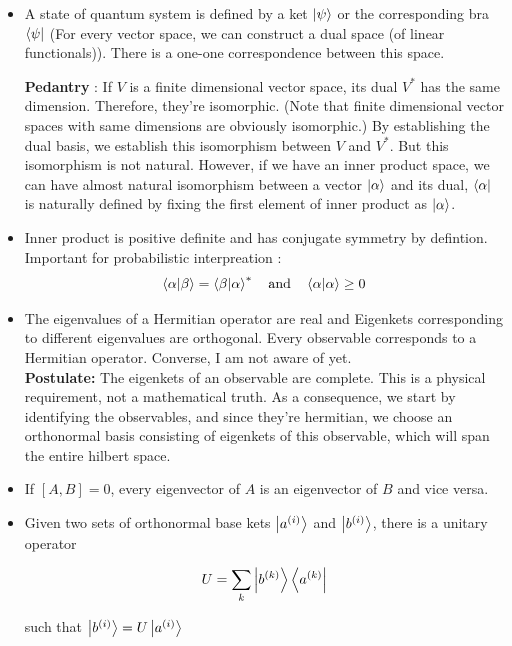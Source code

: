 \documentclass{report}
\begin{document}
\begin{itemize}

  \item A state of quantum system is defined by a ket $\ket{\psi}$ or the corresponding bra $\bra{\psi}$ (For every vector space, we can construct a dual space (of linear functionals)). There is a one-one correspondence between this space.

  \noindent \textbf {Pedantry} : If $V$ is a finite dimensional vector space, its dual $V^*$ has the same dimension. Therefore, they're isomorphic. (Note that finite dimensional vector spaces with same dimensions are obviously isomorphic.) By establishing the dual basis, we establish this isomorphism between $V$ and $V^*$. But this isomorphism is not natural. However, if we have an inner product space, we can have almost natural isomorphism between a vector $\ket{\alpha}$ and its dual, $\bra{\alpha}$ is naturally defined by fixing the first element of inner product as $\ket{\alpha}$.

  \item Inner product is positive definite and has conjugate symmetry by defintion. Important for probabilistic interpreation :
    $$\bra{\alpha}\ket{\beta} = \bra{\beta}\ket{\alpha}^* \quad \textrm{and} \quad \bra{\alpha}\ket{\alpha} \ge 0$$ 

  \item The eigenvalues of a Hermitian operator are real and Eigenkets corresponding to different eigenvalues are orthogonal. Every observable corresponds to a Hermitian operator. Converse, I am not aware of yet. \\

  \textbf{Postulate:} The eigenkets of an observable are complete. This is a physical requirement, not a mathematical truth. As a consequence, we start by identifying the observables, and since they're hermitian, we choose an orthonormal basis consisting of eigenkets of this observable, which will span the entire hilbert space.

\item If $[A,B] = 0$, every eigenvector of $A$ is an eigenvector of $B$ and vice versa.

\item Given two sets of orthonormal base kets ${\ket{a^{(i)}}}$ and ${\ket{b^{(i)}}}$, there is a unitary operator

  $$U = \sum_{k} \ket{b^{(k)}}\bra{a^{(k)}}$$

  such that $\ket{b^{(i)}} = U\ket{a^{(i)}}$


\end{itemize}
\end{document}
